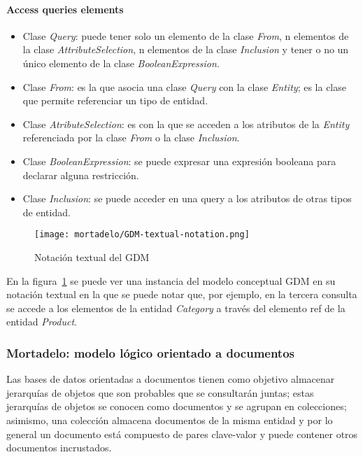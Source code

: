\paragraph*{Access queries elements}


\begin{itemize}
    
    \item Clase \textit{Query}: puede tener solo un elemento de la clase \textit{From}, n elementos de la clase \textit{AttributeSelection}, n elementos de la clase \textit{Inclusion} y tener o no un único elemento de la clase \textit{BooleanExpression}.
    \item Clase \textit{From}: es la que asocia una clase \textit{Query} con la clase \textit{Entity}; es la clase que permite referenciar un tipo de entidad.
    \item Clase \textit{AtributeSelection}: es con la que se acceden a los atributos de la \textit{Entity} referenciada por la clase \textit{From} o la clase \textit{Inclusion}.
    \item Clase \textit{BooleanExpression}: se puede expresar una expresión booleana para declarar alguna restricción.
    \item Clase \textit{Inclusion}: se puede acceder en una query a los atributos de otras tipos de entidad.
    
\end{itemize}

\begin{figure}[h!t] 
    \centering
    \texttt{[image: mortadelo/GDM-textual-notation.png]}
    \caption{Notación textual del GDM}
    \label{img:mortadelo-gdm.textual.notation}
\end{figure}

En la figura~\ref{img:mortadelo-gdm.textual.notation} se puede ver una instancia del modelo conceptual GDM en su notación textual en la que se puede notar que, por ejemplo, en la tercera consulta se accede a los elementos de la entidad \textit{Category} a través del elemento ref de la entidad \textit{Product}.


\newpage\subsubsection*{Mortadelo: modelo lógico orientado a documentos}

Las bases de datos orientadas a documentos tienen como objetivo almacenar jerarquías de objetos que son probables que se consultarán juntas; estas jerarquías de objetos se conocen como documentos y se agrupan en colecciones; asimismo, una colección almacena documentos de la misma entidad y por lo general un documento está compuesto de pares clave-valor y puede contener otros documentos incrustados.


